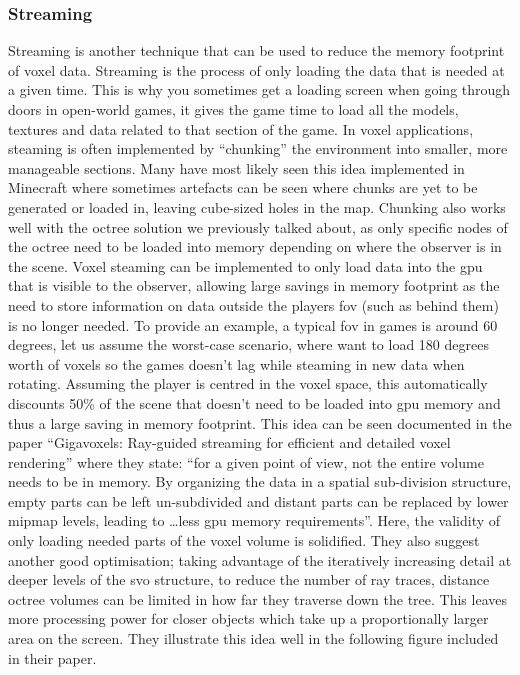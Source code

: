 \documentclass[titlepage]{article}
\begin{document}
\subsubsection*{Streaming}
Streaming is another technique that can be used to reduce the memory footprint of voxel data. Streaming is the process of only loading the data that is needed at a given time. This is why you sometimes get a loading screen when going through doors in open-world games, it gives the game time to load all the models, textures and data related to that section of the game. In voxel applications, steaming is often implemented by ``chunking'' the environment into smaller, more manageable sections. Many have most likely seen this idea implemented in Minecraft \cite{minecraft} where sometimes artefacts can be seen where chunks are yet to be generated or loaded in, leaving cube-sized holes in the map. Chunking also works well with the octree solution we previously talked about, as only specific nodes of the octree need to be loaded into memory depending on where the observer is in the scene. Voxel steaming can be implemented to only load data into the \gls{gpu} that is visible to the observer, allowing large savings in memory footprint as the need to store information on data outside the players \gls{fov} (such as behind them) is no longer needed. To provide an example, a typical \gls{fov} in games is around 60 degrees, let us assume the worst-case scenario, where want to load 180 degrees worth of voxels so the games doesn't lag while steaming in new data when rotating. Assuming the player is centred in the voxel space, this automatically discounts 50\% of the scene that doesn't need to be loaded into \gls{gpu} memory and thus a large saving in memory footprint. This idea can be seen documented in the paper ``Gigavoxels: Ray-guided streaming for efficient and detailed voxel rendering'' \cite{streaming} where they state: ``for a given point of view, not the entire volume needs to be in memory. By organizing the data in a spatial sub-division structure, empty parts can be left un-subdivided and distant parts can be replaced by lower mipmap levels, leading to \dots less \gls{gpu} memory requirements''. Here, the validity of only loading needed parts of the voxel volume is solidified. They also suggest another good optimisation; taking advantage of the iteratively increasing detail at deeper levels of the \gls{svo} structure, to reduce the number of ray traces, distance octree volumes can be limited in how far they traverse down the tree. This leaves more processing power for closer objects which take up a proportionally larger area on the screen. They illustrate this idea well in the following figure included in their paper.
\end{document}
